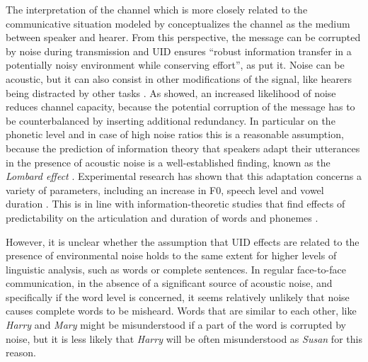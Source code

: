 The interpretation of the channel which is more closely related to the communicative situation modeled by \citet{shannon1948} conceptualizes the channel as the medium between speaker and hearer. From this perspective, the message can be corrupted by noise during transmission and UID ensures ``robust information transfer in a potentially noisy environment while conserving effort'', as \citet[32]{aylett.turk2004} put it. Noise can be acoustic, but it can also consist in other modifications of the signal, like hearers being distracted by other tasks \citep{hauser.etal2019}. As \citet{shannon1948} showed, an increased likelihood of noise reduces channel capacity, because the potential corruption of the message has to be counterbalanced by inserting additional redundancy. In particular on the phonetic level and in case of high noise ratios this is a reasonable assumption, because the prediction of information theory that speakers adapt their utterances in the presence of acoustic noise is a well-established finding, known as the \textit{Lombard effect}  \citep{lombard1911}. Experimental research has shown that this adaptation concerns a variety of parameters, including an increase in F0, speech level and vowel duration \citep{summers.etal1988,junqua1994, junqua1996}. This is in line with information-theoretic studies that find effects of predictability on the articulation and duration of words and phonemes \citep{bell.etal2003, aylett.turk2004, bell.etal2009, brandt.etal2017, brandt.etal2018, malisz.etal2018}.

However, it is unclear whether the assumption that UID effects are related to the presence of environmental noise holds to the same extent for higher levels of linguistic analysis, such as words or complete sentences. In regular face-to-face communication, in the absence of a significant source of acoustic noise, and specifically if the word level is concerned, it seems relatively unlikely that noise causes complete words to be misheard. Words that are similar to each other, like \textit{Harry} and \textit{Mary} might be misunderstood if a part of the word is corrupted by noise, but it is less likely that \textit{Harry} will be often misunderstood as \textit{Susan} for this reason.

